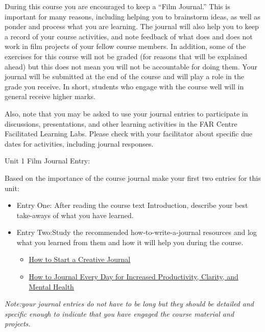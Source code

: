 \documentclass[
]{book}
\providecommand{\tightlist}{%
  \setlength{\itemsep}{0pt}\setlength{\parskip}{0pt}}
\begin{document}
\begin{reflect}
During this course you are encouraged to keep a ``Film Journal.'' This is important for many reasons, including helping you to brainstorm ideas, as well as ponder and process what you are learning. The journal will also help you to keep a record of your course activities, and note feedback of what does and does not work in film projects of your fellow course members. In addition, some of the exercises for this course will not be graded (for reasons that will be explained ahead) but this does not mean you will not be accountable for doing them. Your journal will be submitted at the end of the course and will play a role in the grade you receive. In short, students who engage with the course well will in general receive higher marks.

Also, note that you may be asked to use your journal entries to participate in discussions, presentations, and other learning activities in the FAR Centre Facilitated Learning Labs. Please check with your facilitator about specific due dates for activities, including journal responses.

{Unit 1 Film Journal Entry:}

Based on the importance of the course journal make your first two entries for this unit:

\begin{itemize}
\tightlist
\item
  Entry One: After reading the course text Introduction, describe your best take-aways of what you have learned.
\item
  Entry Two:Study the recommended how-to-write-a-journal resources and log what you learned from them and how it will help you during the course.

  \begin{itemize}
  \tightlist
  \item
    \href{https://karenbanes.com/how-to-start-a-creative-journal/}{How to Start a Creative Journal}
  \item
    \href{https://www.youtube.com/watch?v=hUTWo7_W0lc}{How to Journal Every Day for Increased Productivity, Clarity, and Mental Health}
  \end{itemize}
\end{itemize}

\emph{Note:your journal entries do not have to be long but they should be detailed and specific enough to indicate that you have engaged the course material and projects.}
\end{reflect}
\end{document}
